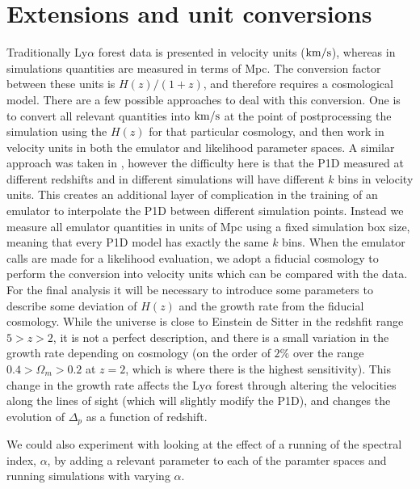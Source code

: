 \documentclass[]{article}
\newcommand{\lyaf}{Ly$\alpha$ forest }                     %
\begin{document}
\section{Extensions and unit conversions}
Traditionally \lyaf data is presented in velocity units ($\rm{km}/s$), whereas in simulations
quantities are measured in terms of Mpc. The conversion factor between these units is $H(z)/(1+z)$,
and therefore requires a cosmological model. There are a few possible approaches to deal
with this conversion. One is to convert all relevant quantities into $\rm{km}/s$ at the point
of postprocessing the simulation using the $H(z)$ for that particular cosmology, and then
work in velocity units in both the emulator and likelihood parameter spaces. A similar
approach was taken in \cite{McDonald2005}, however the difficulty here is that the
P1D measured at different redshifts and in different simulations will have different
$k$ bins in velocity units. This creates an additional layer of complication in the training
of an emulator to interpolate the P1D between different simulation points.
Instead we measure all emulator quantities in units of Mpc using a fixed
simulation box size, meaning that every P1D model has exactly the same $k$ bins. When the
emulator calls are made for a likelihood evaluation, we adopt a fiducial cosmology to
perform the conversion into velocity units which can be compared with the data.
For the final analysis it will be necessary to introduce some parameters to describe
some deviation of $H(z)$ and the growth rate from the fiducial cosmology.
While the universe is close to
Einstein de Sitter in the redshfit range $5>z>2$, it is not a perfect description,
and there is a small variation in the growth rate depending on cosmology (on the order of
$2\%$ over the range $0.4>\Omega_m > 0.2$ at $z=2$, which is where there is the highest
sensitivity). This change in the growth rate affects the \lyaf through altering the
velocities along the lines of sight (which will slightly modify the P1D), and changes
the evolution of $\Delta_p$ as a function of redshift.

We could also experiment with looking at the effect of a running of the spectral index,
$\alpha$, by adding a relevant parameter to each of the paramter spaces and running simulations
with varying $\alpha$.
\end{document}
